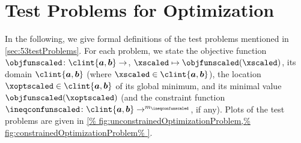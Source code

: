 \chapter{Test Problems for Optimization}
\label{chap:a20testProblems}

In the following, we give formal definitions of the test problems
mentioned in \cref{sec:53testProblems}.
For each problem, we state the objective function
$\objfunscaled\colon \clint{\*a, \*b} \to \real$,
$\xscaled \mapsto \objfunscaled(\xscaled)$,
its domain $\clint{\*a, \*b}$
(where $\xscaled \in \clint{\*a, \*b}$),
the location $\xoptscaled \in \clint{\*a, \*b}$ of its global minimum, and
its minimal value $\objfunscaled(\xoptscaled)$
(and the constraint function
$\ineqconfunscaled\colon \clint{\*a, \*b} \to \real^{m_{\ineqconfunscaled}}$,
if any).
Plots of the test problems are given in
\cref{%
  fig:unconstrainedOptimizationProblem,%
  fig:constrainedOptimizationProblem%
}.

{
  \newcommand*{\centertestfunline}[1]{%
    \mathclap{\hphantom{\mathrm{(B.99a)}}#1}%
  }
  
  
  
}

\cleardoublepage
